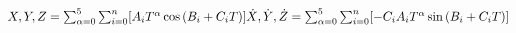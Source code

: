 \documentclass{article}
\begin{document}
\begin{math}
%
%
$$
X,Y,Z=\sum_{\alpha=0}^{5}\sum_{i=0}^{n}\lbrack
A_{i}T^{\alpha}\cos{(B_{i}+C_{i}T)}\rbrack
$$
\\
\\
$$
\dot{X},\dot{Y},\dot{Z}=\sum_{\alpha=0}^{5}\sum_{i=0}^{n}\lbrack
-C_{i}A_{i}T^{\alpha}\sin{(B_{i}+C_{i}T)}\rbrack
$$
\end{math}
\end{document}
